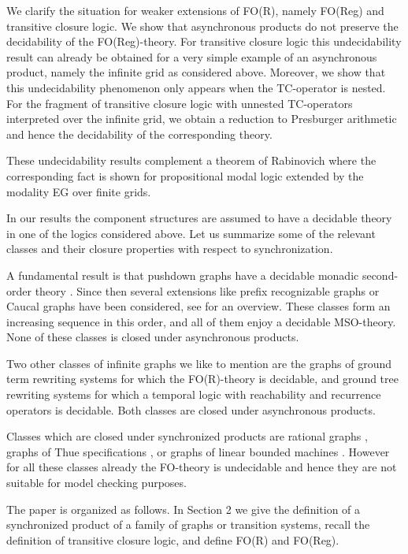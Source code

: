 \documentclass{LMCS}
\begin{document}
We clarify the situation for weaker extensions of FO(R), 
namely FO(Reg) and transitive closure logic. We show that 
asynchronous products do not preserve the decidability of the FO(Reg)-theory. 
For transitive closure logic this undecidability result can already be obtained
for a very simple example of an asynchronous product, namely the infinite grid 
as considered above.
Moreover, we show that this undecidability phenomenon 
only appears when the TC-operator is nested. For the fragment of 
transitive closure logic with unnested TC-operators interpreted over the 
infinite grid,  we obtain a reduction to Presburger arithmetic and hence 
the decidability of the corresponding theory. 

These undecidability results complement a theorem of Rabinovich \cite{rabino07}
where the corresponding fact is shown for propositional modal logic extended by the
modality EG over finite grids.

In our results the component structures are assumed to have a decidable 
theory in one of the logics considered above. Let us summarize some of the
relevant classes and their closure properties with respect to synchronization.

A fundamental result is that pushdown graphs have
a decidable monadic second-order theory \cite{ms85}. Since then
several extensions like prefix recognizable graphs \cite{ca96} or 
Caucal graphs \cite{cau02} have been considered, see \cite{tho03} for an overview. 
These classes form an increasing sequence in this order, and
all of them enjoy a decidable MSO-theory. None of these classes is closed under 
asynchronous products. 

Two other classes of infinite graphs we like to mention are the graphs of 
ground term rewriting systems \cite{col02}  for which the FO(R)-theory is decidable, 
and ground tree rewriting systems \cite{loe02} 
for which a temporal logic with reachability and recurrence operators is decidable. 
Both classes are closed under asynchronous products.

Classes which are closed under synchronized products are rational graphs
\cite{mo00}, graphs of Thue specifications \cite{pay00}, or graphs
of linear bounded machines \cite{kp99}. However for all these
classes already the FO-theory is undecidable and hence they 
are not suitable for model checking purposes.



The paper is organized as follows. In Section 2 we give the definition
of a synchronized product of a family of graphs or transition systems, 
recall the definition of transitive closure logic, and define FO(R) and FO(Reg).
\end{document}
